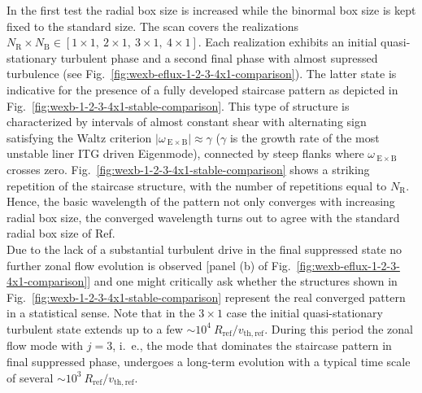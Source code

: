 \documentclass[aip, amsmath, amssymb, reprint, twocolumn]{revtex4-1}
\newcommand{\wexb}{\omega_{\mathrm{\:E \times B}}}
\newcommand{\NR}{N_\mathrm{R}}
\newcommand{\NB}{N_\mathrm{B}}
\newcommand{\vthref}{v_\mathrm{th,ref}}
\newcommand{\Rref}{R_\mathrm{ref}}
\begin{document}
In the first test the radial box size is increased while the binormal box size is kept fixed to the standard size.
The scan covers the realizations $\NR\times\NB \in [ 1\times1,~2\times1,~3\times1,~4\times1]$.
Each realization exhibits an initial quasi-stationary turbulent phase and a second final \cite{peeters2016} phase with almost supressed turbulence (see Fig.~\ref{fig:wexb-eflux-1-2-3-4x1-comparison}).
The latter state is indicative for the presence of a fully developed staircase pattern as depicted in Fig.~\ref{fig:wexb-1-2-3-4x1-stable-comparison}. 
This type of structure is characterized by intervals of almost constant shear with alternating sign satisfying the Waltz criterion $|\wexb| \approx \gamma$\cite{doi:10.1063/1.870934, doi:10.1063/1.872847} ($\gamma$ is the growth rate of the most unstable liner ITG driven Eigenmode), connected by steep flanks where $\wexb$ crosses zero.
Fig.~\ref{fig:wexb-1-2-3-4x1-stable-comparison} shows a striking repetition of the staircase structure, with the number of repetitions equal to $\NR$.
Hence, the basic wavelength of the pattern not only converges with increasing radial box size, the converged wavelength turns out to agree with the standard radial box size of Ref.~\cite{peeters2016} \\
Due to the lack of a substantial turbulent drive in the final suppressed state no further zonal flow evolution is observed [panel (b) of Fig.~\ref{fig:wexb-eflux-1-2-3-4x1-comparison}] and one might critically ask whether the structures shown in Fig.~\ref{fig:wexb-1-2-3-4x1-stable-comparison} represent the real converged pattern in a statistical sense. 
Note that in the $3 \times 1$ case the initial quasi-stationary turbulent state extends up to a few $\sim 10^4~\Rref/\vthref$.
During this period the zonal flow mode with $j = 3$, i.~e., the mode that dominates the staircase pattern in final suppressed phase, undergoes a long-term evolution with a typical time scale of several $\sim 10^3~\Rref/\vthref$. 
\end{document}
